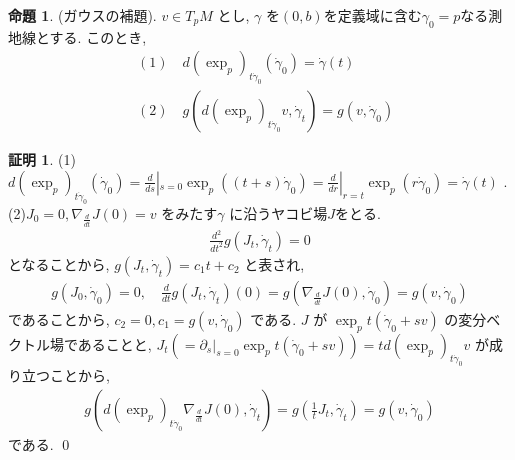 \documentclass[twocolumn, landscape, a4paper , 8pt, fleqn, titlepage ]{jsarticle}
\theoremstyle{definition}
\newtheorem{prop}[dfn]{命題}
\newtheorem*{pf*}{証明}
\renewcommand{\-}{\hyphen}
\begin{document}
\begin{prop}(ガウスの補題).
$v \in T_p M$ とし, $\gamma$ を$(0,b)$を定義域に含む$\gamma_0 = p$なる測地線とする. このとき, 
\begin{align*} &(1) \quad d(\exp_p)_{t \dot \gamma_0} (\dot \gamma_0) = \dot \gamma (t) \\&(2)\quad g(d(\exp_p)_{t \dot \gamma_0} v, \dot \gamma_t) = g(v, \dot \gamma_0)\end{align*}
\end{prop}
\begin{pf*}(1)
$d(\exp_p)_{t \dot \gamma_0} (\dot \gamma_0)  = \frac{d}{ds}|_{s=0} \exp_p ((t+s)\dot \gamma_0) = \frac{d}{dr}|_{r = t} \exp_p(r \dot \gamma _0) =  \dot \gamma (t)  \,\,.$ \\
(2)$J_0 = 0, \nabla_{\frac{d}{dt}} J (0) = v$ をみたす$\gamma$ に沿うヤコビ場$J$をとる. 
\begin{align*} \frac{d^2}{dt^2} g(J_t, \dot \gamma_t) = 0\end{align*}
となることから, $g(J_t, \dot \gamma_t ) = c_1 t + c_2$ と表され,
\begin{align*} g(J_0, \dot \gamma_0)  = 0, \quad  \frac{d}{dt}g(J_t, \dot \gamma_t) (0)= g(\nabla_{\frac{d}{dt} } J(0), \dot \gamma_0) = g(v, \dot \gamma_0) \end{align*}
であることから, $c_2 = 0, c_1 = g(v, \dot \gamma_0)$ である. $J$ が $\exp_p t(\dot \gamma_0 + s v)$ の変分ベクトル場であることと, $J_t (= \partial_s|_{s = 0} \exp_p t(\dot \gamma_0 + s v))= t d (\exp_p) _{t \dot \gamma_0} v$ が成り立つことから, 
\begin{align*} g(d(\exp_p)_{t \dot \gamma_0} \nabla_{\frac{d}{dt} } J(0), \dot \gamma_t  ) = g (\frac{1}{t} J_t, \dot \gamma_t)  = g (v, \dot \gamma_0)\end{align*}
である. 
\qed
\end{pf*}
\end{document}
